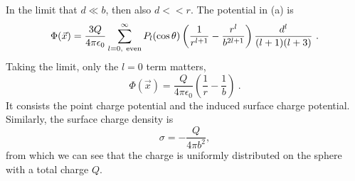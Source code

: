 \documentclass[12pt]{article}
\begin{document}
\newpage
{} In the limit that $d \ll b$, then also $d << r$. The potential in (a) is
\begin{equation}
    \Phi(\vec x) = \frac{3Q}{4\pi \epsilon_0} \sum_{l= 0,~{\rm even}}^\infty P_l(\cos \theta) \left(\frac{1}{r^{l+1}} - \frac{r^l}{b^{2l+1}}\right) \frac{d^l}{(l+1)(l+3)}~.
\end{equation}
Taking the limit, only the $l = 0$ term matters,
\begin{equation}
    \Phi(\vec x) = \frac{Q}{4\pi \epsilon_0} \left(\frac{1}{r} - \frac{1}{b} \right)~.
\end{equation}
It consists the point charge potential and the induced surface charge potential.
Similarly, the surface charge density is
\begin{equation}
    \sigma = -\frac{Q}{4\pi b^2},
\end{equation}
from which we can see that the charge is uniformly distributed on the sphere with a total charge $Q$.
\end{document}
